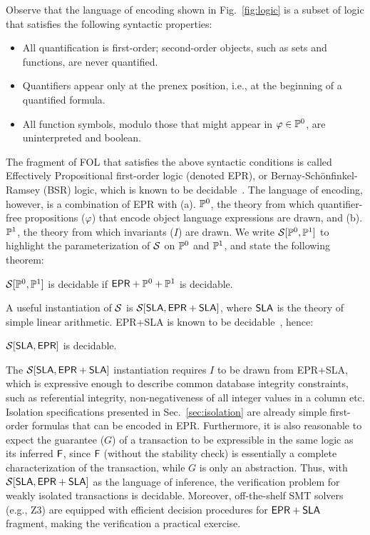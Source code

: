 Observe that the language of encoding shown in Fig.~\ref{fig:logic} is
a subset of logic that satisfies the following syntactic properties:
\begin{itemize}
  \item All quantification is first-order; second-order objects, such
    as sets and functions, are never quantified.
  \item Quantifiers appear only at the prenex position, i.e., at the
    beginning of a quantified formula.  
  \item All function symbols, modulo those that might appear in
    $\varphi\in\mathbb{P}^0$, are uninterpreted and boolean.
\end{itemize}
The fragment of FOL that satisfies the above syntactic conditions is
called Effectively Propositional first-order logic (denoted {\sf
EPR}), or Bernay-Sch{\"o}nfinkel-Ramsey (BSR) logic, which is known to
be decidable~\cite{z3epr}. The language of encoding, however, is a
combination of {\sf EPR} with (a). $\mathbb{P}^0$, the theory from which
quantifier-free propositions ($\varphi$) that encode object language
expressions are drawn, and (b).  $\mathbb{P}^1$, the theory from which
invariants ($I$) are drawn. We write $\mathcal{S}[\mathbb{P}^0,\mathbb{P}^1]$ to
highlight the parameterization of $\mathcal{S}$ on $\mathbb{P}^0$ and $\mathbb{P}^1$,
and state the following theorem:
\begin{theorem}
  $\mathcal{S}[\mathbb{P}^0,\mathbb{P}^1]$ is decidable if ${\sf EPR}+\mathbb{P}^0+\mathbb{P}^1$
  is decidable.
\end{theorem}
A useful instantiation of $\mathcal{S}$ is $\mathcal{S}[{\sf SLA},{\sf EPR}+{\sf
SLA}]$, where ${\sf SLA}$ is the theory of simple linear arithmetic.
{\sf EPR}+{\sf SLA} is known to be decidable~\cite{eprsla}, hence:
\begin{theorem}
  $\mathcal{S}[{\sf SLA},{\sf EPR}]$ is decidable.
\end{theorem}
The $\mathcal{S}[{\sf SLA},{\sf EPR}+{\sf SLA}]$ instantiation requires $I$ to
be drawn from {\sf EPR}+{\sf SLA}, which is expressive enough to
describe common database integrity constraints, such as referential
integrity, non-negativeness of all integer values in a column etc.
Isolation specifications presented in Sec.~\ref{sec:isolation} are
already simple first-order formulas that can be encoded in {\sf EPR}.
Furthermore, it is also reasonable to expect the guarantee ($G$) of a
transaction to be expressible in the same logic as its inferred ${\sf F}$,
since ${\sf F}$ (without the stability check) is essentially a complete
characterization of the transaction, while $G$ is only an abstraction.
Thus, with $\mathcal{S}[{\sf SLA},{\sf EPR}+{\sf SLA}]$ as the language of
inference, the verification problem for weakly isolated transactions
is decidable. Moreover, off-the-shelf SMT solvers (e.g., Z3) are
equipped with efficient decision procedures for ${\sf EPR}+{\sf SLA}$
fragment, making the verification a practical exercise.

